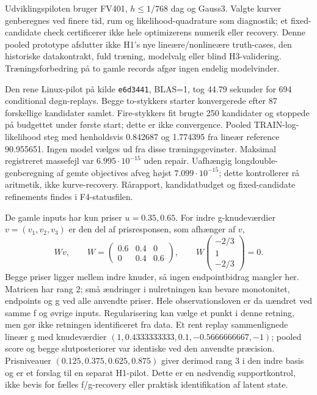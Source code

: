 Udviklingspiloten bruger FV401, $h\leq1/768$ dag og Gauss3. Valgte kurver
genberegnes ved finere tid, rum og likelihood-quadrature som diagnostik; et
fixed-candidate check certificerer ikke hele optimizerens numerik eller recovery.
Denne pooled prototype afslutter ikke H1's nye lineære/nonlineære truth-cases,
den historiske datakontrakt, fuld træning, modelvalg eller blind H3-validering.
Træningsforbedring på to gamle records afgør ingen endelig modelvinder.

Den rene Linux-pilot på kilde \texttt{e6d3441}, BLAS=1, tog 44.79 sekunder
for 694 conditional døgn-replays. Begge to-stykkers starter konvergerede efter
87 forskellige kandidater samlet. Fire-stykkers fit brugte 250 kandidater
og stoppede på budgettet under første start; dette er ikke convergence.
Pooled TRAIN-log-likelihood steg med henholdsvis 0.842687 og 1.774395 fra
lineær reference 90.955651. Ingen model vælges ud fra disse træningsgevinster.
Maksimal registreret massefejl var $6.995\cdot10^{-15}$ uden repair.
Uafhængig longdouble-genberegning af gemte objectives afveg højst
$7.099\cdot10^{-15}$; dette kontrollerer rå aritmetik, ikke kurve-recovery.
Rårapport, kandidatbudget og fixed-candidate refinements findes i F4-statusfilen.

De gamle inputs har kun priser $u=0.35,0.65$. For indre g-knudeværdier
$v=(v_1,v_2,v_3)$ er den del af prisresponsen, som afhænger af $v$,
\[
 Wv,\qquad W=\begin{pmatrix}0.6&0.4&0\\0&0.4&0.6\end{pmatrix},
 \qquad W\begin{pmatrix}-2/3\\1\\-2/3\end{pmatrix}=0.
\]
Begge priser ligger mellem indre knuder, så ingen endpointbidrag mangler her.
Matricen har rang 2; små ændringer i nulretningen kan bevare monotonitet,
endpoints og g ved alle anvendte priser. Hele observationsloven er da uændret
ved samme f og øvrige inputs. Regularisering kan vælge et punkt i denne
retning, men gør ikke retningen identificeret fra data.
Et rent replay sammenlignede lineær g med knudeværdier
$(1,0.4333333333,0.1,-0.5666666667,-1)$; pooled score og begge slutposteriorer
var identiske ved den anvendte præcision. Prisniveauer
$(0.125,0.375,0.625,0.875)$ giver derimod rang 3 i den indre basis og er
et forslag til en separat H1-pilot. Dette er en nødvendig supportkontrol,
ikke bevis for fælles f/g-recovery eller praktisk identifikation af latent state.

